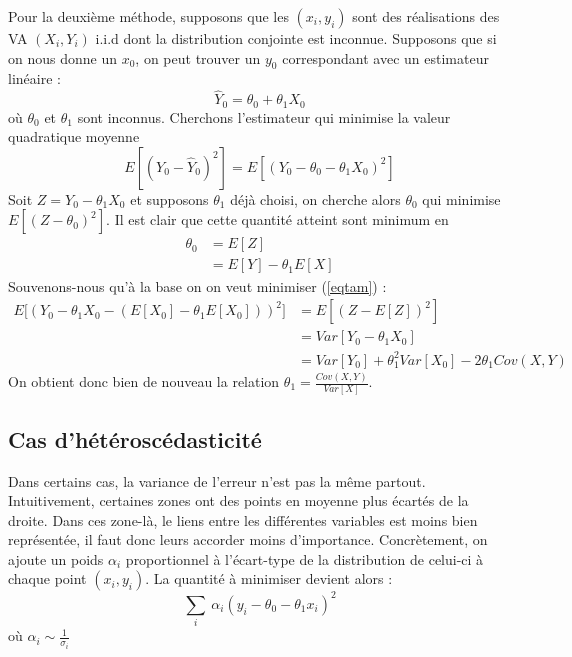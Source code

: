 \documentclass[a4paper,12pt]{report}
\theoremstyle{definition}
\renewcommand{\(}{\left(}
\renewcommand{\)}{\right)}
\begin{document}
            Pour la deuxième méthode, supposons que les $(x_i,y_i)$ sont des réalisations des VA $(X_i,Y_i)$ i.i.d dont la distribution conjointe est inconnue. Supposons que si on nous donne un $x_0$, on peut trouver un $y_0$ correspondant avec un estimateur linéaire :
            $$\hat{Y}_0 = \theta_0+\theta_1 X_0$$
            où $\theta_0$ et $\theta_1$ sont inconnus. Cherchons l'estimateur qui minimise la valeur quadratique moyenne
            \begin{equation}
                E[(Y_0-\hat{Y}_0)^2] = E[(Y_0-\theta_0-\theta_1 X_0)^2]
                \label{eqtam}
            \end{equation}
            Soit $Z = Y_0-\theta_1X_0$ et supposons $\theta_1$ déjà choisi, on cherche alors $\theta_0$ qui minimise $E[(Z-\theta_0)^2]$. Il est clair que cette quantité atteint sont minimum en 
            \begin{align*}
                \theta_0 &= E[Z] \\
                &= E[Y]-\theta_1 E[X]
            \end{align*}
            Souvenons-nous qu'à la base on on veut minimiser (\ref{eqtam}) :
            \begin{align*}
                E\Big[\left( Y_0-\theta_1 X_0-(E[X_0]-\theta_1E[X_0]) \right)^2\Big] &= E[(Z-E[Z])^2] \\
                &= Var[Y_0-\theta_1X_0] \\
                &= Var[Y_0] + \theta_1^2 Var[X_0] - 2\theta_1Cov(X,Y)
            \end{align*}
            On obtient donc bien de nouveau la relation $\theta_1=\frac{Cov(X,Y)}{Var[X]}$.
        
        \subsection{Cas d'hétéroscédasticité}
        
            Dans certains cas, la variance de l'erreur n'est pas la même partout. Intuitivement, certaines zones ont des points en moyenne plus écartés de la droite. Dans ces zone-là, le liens entre les différentes variables est moins bien représentée, il faut donc leurs accorder moins d'importance. Concrètement, on ajoute un poids $\alpha_i$ proportionnel à l'écart-type de la distribution de celui-ci à chaque point $(x_i,y_i)$. La quantité à minimiser devient alors :
            $$\sum_i~\alpha_i(y_i-\theta_0-\theta_1 x_i)^2$$
            où $\alpha_i\sim \frac{1}{\sigma_i}$
            
\end{document}
